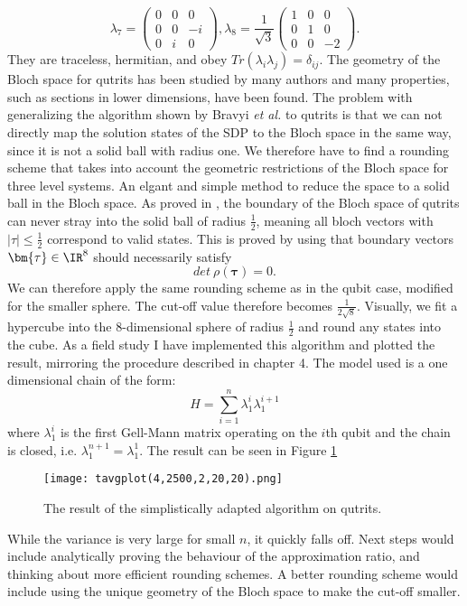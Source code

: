 \[
\lambda_7=\begin{pmatrix} 0 & 0 & 0 \\ 0 & 0 & -i \\ 0 & i & 0 \end{pmatrix},
\lambda_8=\frac{1}{\sqrt{3}} \begin{pmatrix} 1 & 0 & 0 \\ 0 & 1 & 0 \\ 0 & 0 & -2 \end{pmatrix}
.\]
They are traceless, hermitian, and obey $Tr\left(\lambda_i\lambda_j\right)=\delta_{ij}$.
The geometry of the Bloch space for qutrits has been studied by many authors \cite{mendas06,goyal16,kimura03} and many properties, such as sections in lower dimensions, have been found.
The problem with generalizing the algorithm shown by Bravyi \emph{et al.} to qutrits is that we can not directly map the solution states of the SDP to the Bloch space in the same way, since it is not a solid ball with radius one.
We therefore have to find a rounding scheme that takes into account the geometric restrictions of the Bloch space for three level systems.
An elgant and simple method to reduce the space to a solid ball in the Bloch space.
As proved in \cite{goyal16}, the boundary of the Bloch space of qutrits can never stray into the solid ball of radius $\frac{1}{2}$, meaning all bloch vectors with $ \left| \tau \right| \le \frac{1}{2}$ correspond to valid states.
This is proved by using that boundary vectors $\bm{\tau}\in\IR^{8}$ should necessarily satisfy \[
	det ~ \rho(\bm{\tau}) = 0
.\]
We can therefore apply the same rounding scheme as in the qubit case, modified for the smaller sphere.
The cut-off value therefore becomes $\frac{1}{2\sqrt{8}}$.
Visually, we fit a hypercube into the $8$-dimensional sphere of radius $\frac{1}{2}$ and round any states into the cube.
As a field study I have implemented this algorithm and plotted the result, mirroring the procedure described in chapter 4.
The model used is a one dimensional chain of the form: \[
H = \sum_{i=1}^{n}\lambda_1^{i}\lambda_1^{i+1}
\]
where $\lambda^{i}_{1}$ is the first Gell-Mann matrix operating on the $i$th qubit and the chain is closed, i.e. $\lambda^{n+1}_1=\lambda^{1}_1$.
The result can be seen in Figure \ref{fig:4}
\begin{figure}[H]
	\centering
	\texttt{[image: tavgplot(4,2500,2,20,20).png]}
	\caption{The result of the simplistically adapted algorithm on qutrits.}
	\label{fig:4}
\end{figure}
\noindent While the variance is very large for small $n$, it quickly falls off.
Next steps would include analytically proving the behaviour of the approximation ratio, and thinking about more efficient rounding schemes.
A better rounding scheme would include using the unique geometry of the Bloch space to make the cut-off smaller.
